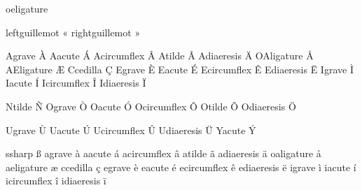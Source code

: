 

\startencoding[pdfdoc] %
      
 oeligature        ^^9c

 leftguillemot     ^^ab
 rightguillemot    ^^bb

 Agrave            ^^c0 
 Aacute            ^^c1 
 Acircumflex       ^^c2 
 Atilde            ^^c3 
 Adiaeresis        ^^c4 
 OAligature        ^^c5
 AEligature        ^^c6
 Ccedilla          ^^c7
 Egrave            ^^c8 
 Eacute            ^^c9 
 Ecircumflex       ^^ca 
 Ediaeresis        ^^cb 
 Igrave            ^^cc 
 Iacute            ^^cd 
 Icircumflex       ^^ce 
 Idiaeresis        ^^cf 

 Ntilde            ^^d1 
 Ograve            ^^d2 
 Oacute            ^^d3 
 Ocircumflex       ^^d4 
 Otilde            ^^d5 
 Odiaeresis        ^^d6 

 Ugrave            ^^d9 
 Uacute            ^^da 
 Ucircumflex       ^^db 
 Udiaeresis        ^^dc 
 Yacute            ^^dd 

 ssharp            ^^df
 agrave            ^^e0
 aacute            ^^e1
 acircumflex       ^^e2
 atilde            ^^e3
 adiaeresis        ^^e4
 oaligature        ^^e5
 aeligature        ^^e6
 ccedilla          ^^e7
 egrave            ^^e8
 eacute            ^^e9
 ecircumflex       ^^ea
 ediaeresis        ^^eb
 igrave            ^^ec
 iacute            ^^ed
 icircumflex       ^^ee
 idiaeresis        ^^ef

